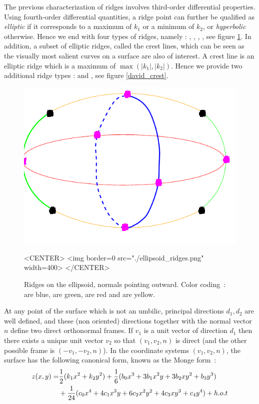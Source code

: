 The previous characterization of ridges involves third-order
differential properties. Using fourth-order differential quantities, a
ridge point can further be qualified as {\em elliptic} if it
corresponds to a maximum of $k_1$ or a minimum of $k_2$, or {\em
hyperbolic} otherwise. Hence we end with four types of ridges, namely
: , , ,
, see figure \ref{ellipsoid_ridges}.
In addition, a subset of elliptic ridges, called the crest lines,
which can be seen as the visually most salient curves on a surface are
also of interest. A crest line is an elliptic ridge which is a maximum
of $\max(|k_1|,|k_2|)$. Hence we provide two additional ridge types :
 and , see figure \ref{david_crest}.


\begin{figure}[!ht]
\begin{ccTexOnly}
\centerline{
\includegraphics[width=.5\linewidth]{Ridges_3/ellipsoid_ridges}}
\end{ccTexOnly}
\caption{Ridges on the ellipsoid, normals pointing outward.
 Color coding~:  are blue,
 are green,  are red and 
 are yellow.}
\label{ellipsoid_ridges}
\begin{ccHtmlOnly}
<CENTER> <img border=0 src="./ellipsoid_ridges.png" width=400>
</CENTER>
\end{ccHtmlOnly}
\end{figure}

At any point of the surface which is not an umbilic, principal
directions $d_1, d_2$ are well defined, and these (non oriented)
directions together with the normal vector $n$ define two direct
orthonormal frames. If $v_1$ is a unit vector of direction $d_1$ then
there exists a unique unit vector $v_2$ so that $(v_1,v_2,n)$ is
direct (and the other possible frame is $(-v_1,-v_2,n)$). In the
coordinate systems $(v_1,v_2,n)$, the surface has the following
canonical form, known as the Monge form~:
%
\begin{eqnarray}
\label{eq:monge}
z(x,y) =  & \frac{1}{2}(k_1x^2 + k_2y^2)+
	\frac{1}{6}(b_0x^3+3b_1x^2y+3b_2xy^2+b_3y^3) \\
  &  +\frac{1}{24}(c_0x^4+4c_1x^3y+6c_2x^2y^2+4c_3xy^3+c_4y^4) + h.o.t
\end{eqnarray}

